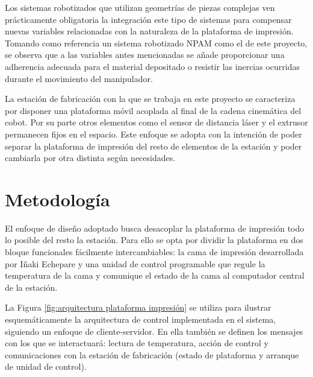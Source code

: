 Los sistemas robotizados que utilizan geometrías de piezas complejas ven prácticamente obligatoria la integración este tipo de sistemas para compensar nuevas variables relacionadas con la naturaleza de la plataforma de impresión. Tomando como referencia un sistema robotizado \acrshort{NPAM} como el de este proyecto, se observa que a las variables antes mencionadas se añade proporcionar una adherencia adecuada para el material depositado o resistir las inercias ocurridas durante el movimiento del manipulador.

La estación de fabricación con la que se trabaja en este proyecto se caracteriza por disponer una plataforma móvil acoplada al final de la cadena cinemática del cobot. Por su parte otros elementos como el sensor de distancia láser y el extrusor permanecen fijos en el espacio. Este enfoque se adopta con la intención de poder separar la plataforma de impresión del resto de elementos de la estación y poder cambiarla por otra distinta según necesidades. 

\section{Metodología}
El enfoque de diseño adoptado busca desacoplar la plataforma de impresión todo lo posible del resto la estación. Para ello se opta por dividir la plataforma en dos bloque funcionales fácilmente intercambiables: la cama de impresión desarrollada por Iñaki Echepare \cite{TFM_IñakiEchepare} y una unidad de control programable que regule la temperatura de la cama y comunique el estado de la cama al computador central de la estación. 

La Figura \ref{fig:arquitectura plataforma impresión} se utiliza para ilustrar esquemáticamente la arquitectura de control implementada en el sistema, siguiendo un enfoque de cliente-servidor. En ella también se definen los mensajes con los que se interactuará: lectura de temperatura, acción de control y comunicaciones con la estación de fabricación (estado de plataforma y arranque de unidad de control).

